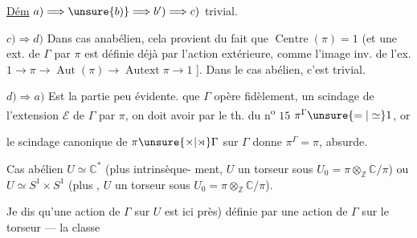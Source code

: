 


\uline{Dém} $a)\Longrightarrow\unsure{b)}\Longrightarrow b')\Longrightarrow c)$ trivial.

$c)\Longrightarrow d)$ Dans cas anabélien, cela provient
du fait que $\operatorname{Centre}(\pi)=1$ (et une ext.
de $\Gamma$ par $\pi$ est définie déjà par l'action
extérieure,  comme l'image inv.
de l'ex. $1\longrightarrow\pi\longrightarrow\operatorname{Aut}(\pi)
\longrightarrow\operatorname{Autext}\pi\longrightarrow1$ ].
Dans le cas abélien, c'est trivial.

$d)\Longrightarrow a)$ Est la partie peu évidente. 
  que $\Gamma$
opère fidèlement, 
 
  un scindage de l'extension
$\mathcal E$ de $\Gamma$ par $\pi$, on doit avoir
par le th. du n\textsuperscript{o} $15$ $\pi^\Gamma\unsure{=|\simeq}1$, or

le scindage canonique de $\pi\unsure{\times|\rtimes}\Gamma$ sur $\Gamma$
donne $\pi^\Gamma=\pi$, absurde.

Cas abélien $U\simeq\mathbb C^*$ (plus intrinsèque-
ment, $U$ un torseur sous $U_0=\pi\otimes_{\mathbb Z}\mathbb C/\pi$)
ou $U\simeq S^1\times S^1$ (plus ,
$U$ un torseur sous $U_0=\pi\otimes_{\mathbb Z}\mathbb C/\pi$).

Je dis qu'une action de $\Gamma$ sur $U$ est
ici    près) définie par une action
de $\Gamma$ sur le torseur --- la classe


